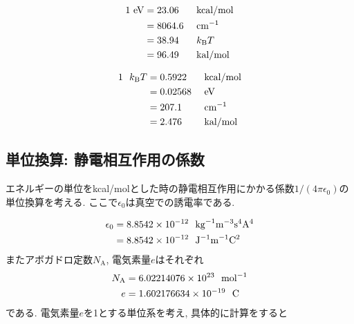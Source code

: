 \begin{alignat}{3}
  1~\mathrm{eV}
  &= 23.06   &&~\mathrm{kcal/mol}      \notag \\
  &= 8064.6  &&~\mathrm{cm^{-1}} \notag \\
  &= 38.94   &&~k_{\mathrm{B}}T  \notag \\
  &= 96.49   &&~\mathrm{kal/mol} \notag
\end{alignat}

\begin{alignat}{3}
  1~~k_{\mathrm{B}}T
  &= 0.5922  &&~\mathrm{kcal/mol} \notag \\
  &= 0.02568 &&~\mathrm{eV}      \notag \\
  &= 207.1   &&~\mathrm{cm^{-1}} \notag \\
  &= 2.476   &&~\mathrm{kal/mol} \notag
\end{alignat}

\subsection{単位換算: 静電相互作用の係数}
エネルギーの単位をkcal/molとした時の静電相互作用にかかる係数$1/(4\pi \epsilon_{0})$の単位換算を考える.
ここで$\epsilon_{0}$は真空での誘電率である.

\begin{align}
  \epsilon_{0} &= 8.8542 \times 10^{-12}
               ~~ \mathrm{kg}^{-1} \mathrm{m}^{-3} \mathrm{s}^{4} \mathrm{A}^{4}
  \notag \\
               &= 8.8542 \times 10^{-12}
               ~~ \mathrm{J}^{-1} \mathrm{m}^{-1} \mathrm{C}^{2}
  \notag
\end{align}
またアボガドロ定数$N_{\mathrm{A}}$, 電気素量$e$はそれぞれ
\begin{align}
  N_{\mathrm{A}} &= 6.022 140 76 \times 10^{23}
                 ~~ \mathrm{mol}^{-1}
  \notag \\
  e &= 1.602 176 634 \times 10^{-19} ~~ \mathrm{C}
  \notag
\end{align}
である. 電気素量$e$を1とする単位系を考え, 具体的に計算をすると


